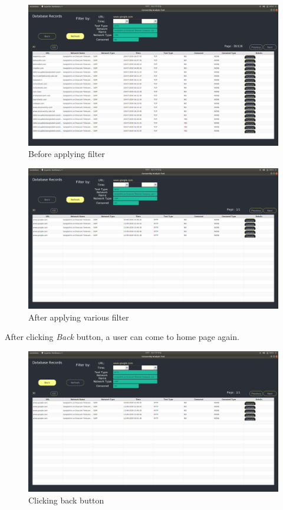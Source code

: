 \begin{figure}[h]
    \centering
    \includegraphics[width=\textwidth]{usersite/5beforefilter.png}
    \caption{Before applying filter}
    \label{fig:user5}
\end{figure}

\begin{figure}[h]
    \centering
    \includegraphics[width=\textwidth]{usersite/6afterfilter.png}
    \caption{After applying various filter}
    \label{fig:user6}
\end{figure}

After clicking \emph{Back} button, a user can come to home page again. 
\begin{figure}[h]
    \centering
    \includegraphics[width=\textwidth]{usersite/7back.png}
    \caption{Clicking back button}
    \label{fig:user7}
\end{figure}

